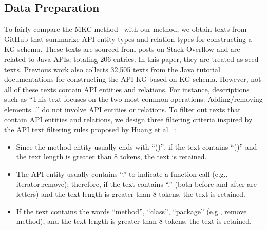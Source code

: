 \subsection{Data Preparation} \label{sec: data pre}
To fairly compare the MKC method~\cite{Manual} with our method, we obtain texts from GitHub that summarize API entity types and relation types for constructing a KG schema. 
These texts are sourced from posts on Stack Overflow and are related to Java APIs, totaling 206 entries.
In this paper, they are treated as seed texts.
Previous work \cite{Manual} also collects 32,505 texts from the Java tutorial~\cite{javatutorial} documentations for constructing the API KG based on KG schema.
However, not all of these texts contain API entities and relations.
For instance, descriptions such as ``This text focuses on the two most common operations: Adding/removing elements...'' do not involve API entities or relations.
To filter out texts that contain API entities and relations, we design three filtering criteria inspired by the API text filtering rules proposed by Huang et al.~\cite{yanbang1}:
\begin{itemize}[leftmargin=*]
    \item Since the method entity usually ends with ``()'', if the text contains ``()'' and the text length is greater than 8 tokens, the text is retained.
    \item The API entity usually contains ``.'' to indicate a function call (e.g., iterator.remove); therefore, if the text contains ``.'' (both before and after are letters) and the text length is greater than 8 tokens, the text is retained.
    \item If the text contains the words ``method'', ``class'', ``package'' (e.g., remove method), and the text length is greater than 8 tokens, the text is retained.
\end{itemize}


